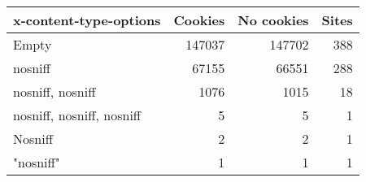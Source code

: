 \begin{tabular}{lrrr}
\toprule
   x-content-type-options &  Cookies &  No cookies &  Sites \\
\midrule
                    Empty &   147037 &      147702 &    388 \\
                  nosniff &    67155 &       66551 &    288 \\
         nosniff, nosniff &     1076 &        1015 &     18 \\
nosniff, nosniff, nosniff &        5 &           5 &      1 \\
                  Nosniff &        2 &           2 &      1 \\
                "nosniff" &        1 &           1 &      1 \\
\bottomrule
\end{tabular}
